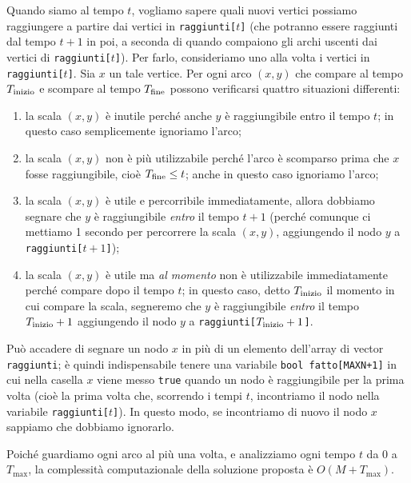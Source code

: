 Quando siamo al tempo $t$, vogliamo sapere quali nuovi vertici possiamo raggiungere a partire dai vertici in \texttt{raggiunti[$t$]} (che potranno essere raggiunti dal tempo $t+1$ in poi, a seconda di quando compaiono gli archi uscenti dai vertici di \texttt{raggiunti[$t$]}). Per farlo, consideriamo uno alla volta i vertici in \texttt{raggiunti[$t$]}. Sia $x$ un tale vertice. Per ogni arco $(x, y)$ che compare al tempo $T_{\mathrm{inizio}}$ e scompare al tempo $T_{\mathrm{fine}}$ possono verificarsi quattro situazioni differenti:
\begin{enumerate}
	\item la scala $(x, y)$ è inutile perché anche $y$ è raggiungibile entro il tempo $t$; in questo caso semplicemente ignoriamo l'arco;
	\item la scala $(x, y)$ non è più utilizzabile perché l'arco è scomparso prima che $x$ fosse raggiungibile, cioè $T_{\mathrm{fine}} \le t$; anche in questo caso ignoriamo l'arco;
	\item la scala $(x, y)$ è utile e percorribile immediatamente, allora dobbiamo segnare che $y$ è raggiungibile \emph{entro} il tempo $t+1$ (perché comunque ci mettiamo 1 secondo per percorrere la scala $(x, y)$, aggiungendo il nodo $y$ a \texttt{raggiunti[$t+1$]});
	\item la scala $(x, y)$ è utile ma \emph{al momento} non è utilizzabile immediatamente perché compare dopo il tempo $t$; in questo caso, detto $T_{\mathrm{inizio}}$ il momento in cui compare la scala, segneremo che $y$ è raggiungibile \emph{entro} il tempo $T_{\mathrm{inizio}}+1$ aggiungendo il nodo $y$ a \texttt{raggiunti[$T_{\mathrm{inizio}}+1$]}.
\end{enumerate}

Può accadere di segnare un nodo $x$ in più di un elemento dell'array di vector \texttt{raggiunti}; è quindi indispensabile tenere  una variabile \texttt{bool fatto[MAXN+1]} in cui nella casella $x$ viene messo \texttt{true} quando un nodo è raggiungibile per la prima volta (cioè la prima volta che, scorrendo i tempi $t$, incontriamo il nodo nella variabile \texttt{raggiunti[$t$]}). In questo modo, se incontriamo di nuovo il nodo $x$ sappiamo che dobbiamo ignorarlo.

Poiché guardiamo ogni arco al più una volta, e analizziamo ogni tempo $t$ da $0$ a $T_{\max}$, la complessità computazionale della soluzione proposta è $O(M + T_{\max})$.















